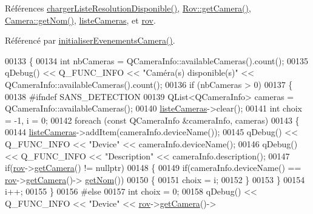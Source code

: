 Références \hyperlink{ihmreglagevideo_8cpp_source_l00172}{charger\+Liste\+Resolution\+Disponible()}, \hyperlink{rov_8cpp_source_l00144}{Rov\+::get\+Camera()}, \hyperlink{camera_8cpp_source_l00103}{Camera\+::get\+Nom()}, \hyperlink{ihmreglagevideo_8h_source_l00038}{liste\+Cameras}, et \hyperlink{ihmreglagevideo_8h_source_l00027}{rov}.



Référencé par \hyperlink{ihmreglagevideo_8cpp_source_l00117}{initialiser\+Evenements\+Camera()}.


\begin{DoxyCode}
00133 \{
00134     \textcolor{keywordtype}{int} nbCameras = QCameraInfo::availableCameras().count();
00135     qDebug() << Q\_FUNC\_INFO << \textcolor{stringliteral}{"Caméra(s) disponible(s)"} << QCameraInfo::availableCameras().count();    
00136     \textcolor{keywordflow}{if} (nbCameras > 0)
00137     \{
00138 \textcolor{preprocessor}{       #ifndef SANS\_DETECTION}
00139        QList<QCameraInfo> cameras = QCameraInfo::availableCameras();
00140        \hyperlink{class_i_h_m_reglage_video_a38a35548ddd0e5750917305ac6f32142}{listeCameras}->clear();
00141        \textcolor{keywordtype}{int} choix = -1, i = 0;
00142        \textcolor{keywordflow}{foreach} (\textcolor{keyword}{const} QCameraInfo &cameraInfo, cameras)
00143        \{
00144            \hyperlink{class_i_h_m_reglage_video_a38a35548ddd0e5750917305ac6f32142}{listeCameras}->addItem(cameraInfo.deviceName());
00145            qDebug() << Q\_FUNC\_INFO << \textcolor{stringliteral}{"Device"} << cameraInfo.deviceName();
00146            qDebug() << Q\_FUNC\_INFO << \textcolor{stringliteral}{"Description"} << cameraInfo.description();
00147            \textcolor{keywordflow}{if}(\hyperlink{class_i_h_m_reglage_video_a755736fe361e651453de6bc21725a626}{rov}->\hyperlink{class_rov_ac1eeb568d39018359b89384c2ee6ee86}{getCamera}() != \textcolor{keyword}{nullptr})
00148            \{
00149                \textcolor{keywordflow}{if}(cameraInfo.deviceName() == \hyperlink{class_i_h_m_reglage_video_a755736fe361e651453de6bc21725a626}{rov}->\hyperlink{class_rov_ac1eeb568d39018359b89384c2ee6ee86}{getCamera}()->
      \hyperlink{class_camera_a9b27a8a444006f40548a9a4ecf4d7256}{getNom}())
00150                \{
00151                    choix = i;
00152                \}
00153            \}
00154            i++;
00155        \}
00156 \textcolor{preprocessor}{       #else}
00157        \textcolor{keywordtype}{int} choix = 0;
00158        qDebug() << Q\_FUNC\_INFO << \textcolor{stringliteral}{"Device"} << \hyperlink{class_i_h_m_reglage_video_a755736fe361e651453de6bc21725a626}{rov}->\hyperlink{class_rov_ac1eeb568d39018359b89384c2ee6ee86}{getCamera}()->

\end{DoxyCode}
